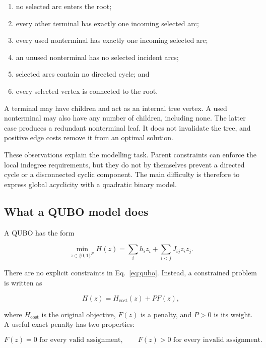 \documentclass[10pt,a4paper]{article}
\begin{document}
\begin{enumerate}
  \item no selected arc enters the root;
  \item every other terminal has exactly one incoming selected arc;
  \item every used nonterminal has exactly one incoming selected arc;
  \item an unused nonterminal has no selected incident arcs;
  \item selected arcs contain no directed cycle; and
  \item every selected vertex is connected to the root.
\end{enumerate}

A terminal may have children and act as an internal tree vertex. A used
nonterminal may also have any number of children, including none. The latter
case produces a redundant nonterminal leaf. It does not invalidate the tree,
and positive edge costs remove it from an optimal solution.

These observations explain the modelling task. Parent constraints can enforce
the local indegree requirements, but they do not by themselves prevent a
directed cycle or a disconnected cyclic component. The main difficulty is
therefore to express global acyclicity with a quadratic binary model.

\subsection{What a QUBO model does}

A QUBO has the form

\begin{equation}
\min_{z\in\{0,1\}^N}
H(z)=\sum_i h_i z_i+\sum_{i<j}J_{ij}z_i z_j.
\label{eq:qubo}
\end{equation}

There are no explicit constraints in Eq.~\eqref{eq:qubo}. Instead, a
constrained problem is written as

\begin{equation}
H(z)=H_{\mathrm{cost}}(z)+P F(z),
\label{eq:cost-plus-penalty}
\end{equation}

where $H_{\mathrm{cost}}$ is the original objective, $F(z)$ is a penalty, and
$P>0$ is its weight. A useful exact penalty has two properties:

\[
F(z)=0 \text{ for every valid assignment},
\qquad
F(z)>0 \text{ for every invalid assignment}.
\]
\end{document}
